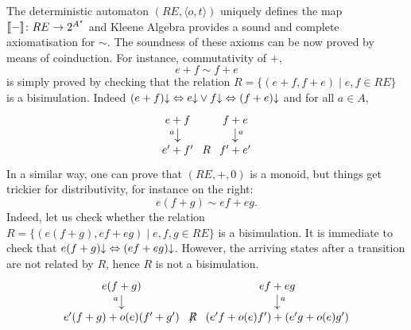 \documentclass[smallcondensed,envcountsect,envcountsame]{svjour3}     %
\begin{document}
The deterministic automaton $(RE,\langle o,t\rangle)$ uniquely defines
the map $[\![ - ]\!]\colon RE \to 2^{A^\star}$ and Kleene Algebra provides a
sound and complete axiomatisation for $\sim$. The soundness of these
axioms can be now proved by means of coinduction.  For instance,
commutativity of $+$,
$$ e+f \sim f+e$$ is simply proved by checking that the relation $R=\{(e+f,f+e) \mid e,f\in RE \}$ is a bisimulation. Indeed 
$(e+f){\downarrow} \Leftrightarrow e{\downarrow} \vee f{\downarrow} \Leftrightarrow (f+e){\downarrow}$ and for all $a\in A$, 
$$\xymatrix@C=2pt@R=3pt{
  e+f \ar[dd]_(0.4)a & & f+e \ar[dd]^(0.4)a \\
  \\
  e'+f' & R & f'+e' }
$$
In a similar way, one can prove that $(RE,+,0)$ is a monoid,
but things get trickier for distributivity, for instance on the right:
$$e(f+g)\sim ef + eg\text{.}$$
Indeed, let us check whether the relation $R=\{(e(f+g), ef + eg) \mid e,f,g\in RE \}$ is a bisimulation. 
It is immediate to check that $e(f+g){\downarrow} \Leftrightarrow (ef + eg){\downarrow}$.
However, the arriving states after a transition are not related by
$R$, hence $R$ is not a bisimulation.
\begin{equation}\label{probdistr}
  \lower -15pt
  \hbox{\xymatrix@C=2pt@R=3pt{
      e(f+g) \ar[dd]_(0.4)a && ef + eg \ar[dd]^(0.4)a \\
      \\
      e'(f+g)+o(e) (f'+g') & \not \hspace{-0.1cm}R & (e'f +o(e) f') +(e'g +o(e) g')
    }}
\end{equation}
\end{document}
